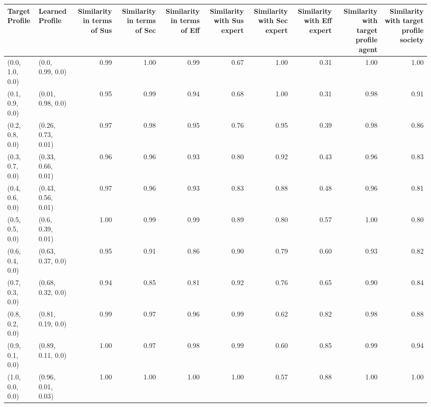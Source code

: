 \begin{tabular}{llrrrrrrrr}
\toprule
Target Profile & Learned Profile & Similarity in terms of Sus & Similarity in terms of Sec & Similarity in terms of Eff & Similarity with Sus expert & Similarity with Sec expert & Similarity with Eff expert & Similarity with target profile agent & Similarity with target profile society \\
\midrule
(0.0, 1.0, 0.0) & (0.0, 0.99, 0.0) & 0.99 & 1.00 & 0.99 & 0.67 & 1.00 & 0.31 & 1.00 & 1.00 \\
(0.1, 0.9, 0.0) & (0.01, 0.98, 0.0) & 0.95 & 0.99 & 0.94 & 0.68 & 1.00 & 0.31 & 0.98 & 0.91 \\
(0.2, 0.8, 0.0) & (0.26, 0.73, 0.01) & 0.97 & 0.98 & 0.95 & 0.76 & 0.95 & 0.39 & 0.98 & 0.86 \\
(0.3, 0.7, 0.0) & (0.33, 0.66, 0.01) & 0.96 & 0.96 & 0.93 & 0.80 & 0.92 & 0.43 & 0.96 & 0.83 \\
(0.4, 0.6, 0.0) & (0.43, 0.56, 0.01) & 0.97 & 0.96 & 0.93 & 0.83 & 0.88 & 0.48 & 0.96 & 0.81 \\
(0.5, 0.5, 0.0) & (0.6, 0.39, 0.01) & 1.00 & 0.99 & 0.99 & 0.89 & 0.80 & 0.57 & 1.00 & 0.80 \\
(0.6, 0.4, 0.0) & (0.63, 0.37, 0.0) & 0.95 & 0.91 & 0.86 & 0.90 & 0.79 & 0.60 & 0.93 & 0.82 \\
(0.7, 0.3, 0.0) & (0.68, 0.32, 0.0) & 0.94 & 0.85 & 0.81 & 0.92 & 0.76 & 0.65 & 0.90 & 0.84 \\
(0.8, 0.2, 0.0) & (0.81, 0.19, 0.0) & 0.99 & 0.97 & 0.96 & 0.99 & 0.62 & 0.82 & 0.98 & 0.88 \\
(0.9, 0.1, 0.0) & (0.89, 0.11, 0.0) & 1.00 & 0.97 & 0.98 & 0.99 & 0.60 & 0.85 & 0.99 & 0.94 \\
(1.0, 0.0, 0.0) & (0.96, 0.01, 0.03) & 1.00 & 1.00 & 1.00 & 1.00 & 0.57 & 0.88 & 1.00 & 1.00 \\
\bottomrule
\end{tabular}
